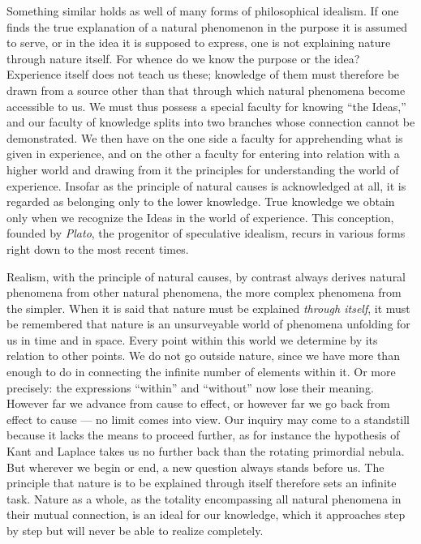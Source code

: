 \documentclass[12pt,a4paper,openany]{book}
\newcommand{\opage}[1]{\marginnote{\footnotesize\textit{[#1]}}}
\begin{document}
Something similar holds as well of many forms of philosophical idealism. If one finds the true explanation of a natural phenomenon in the purpose it is assumed to serve, or in the idea it is supposed to express, one is not explaining nature through nature itself. For whence do we know the purpose or the idea? Experience itself does not teach us these; knowledge of them must therefore be drawn from a source other than that through which natural phenomena become accessible to us. We must thus possess a special faculty for knowing ``the Ideas,'' and our faculty of knowledge splits into two branches whose connection cannot be demonstrated. We then have on the one side a faculty for apprehending what is given in experience, and on the other a faculty for entering into relation with a higher world and drawing from it the principles for understanding the world of experience. Insofar as the principle of natural causes is acknowledged at all, it is regarded as belonging only to the lower knowledge. True knowledge we obtain only when we recognize the Ideas in the world of experience. This conception, founded by \emph{Plato}, the
\opage{4}progenitor of speculative idealism, recurs in various forms right down to the most recent times.

Realism, with the principle of natural causes, by contrast always derives natural phenomena from other natural phenomena, the more complex phenomena from the simpler. When it is said that nature must be explained \emph{through itself}, it must be remembered that nature is an unsurveyable world of phenomena unfolding for us in time and in space. Every point within this world we determine by its relation to other points. We do not go outside nature, since we have more than enough to do in connecting the infinite number of elements within it. Or more precisely: the expressions ``within'' and ``without'' now lose their meaning. However far we advance from cause to effect, or however far we go back from effect to cause --- no limit comes into view. Our inquiry may come to a standstill because it lacks the means to proceed further, as for instance the hypothesis of Kant and Laplace takes us no further back than the rotating primordial nebula. But wherever we begin or end, a new question always stands before us. The principle that nature is to be explained through itself therefore sets an infinite task. Nature as a whole, as the totality encompassing all natural phenomena in their mutual connection, is an ideal for our knowledge, which it approaches step by step but will never be able to realize completely.
\end{document}
